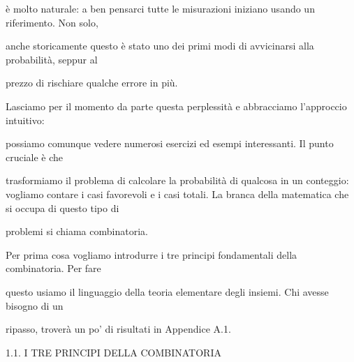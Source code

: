 \documentclass[a4paper,portrait,12pt]{article}
\begin{document}
\begin{flushleft}
\`{e} molto naturale: a ben pensarci tutte le misurazioni iniziano usando un riferimento. Non solo,
\end{flushleft}


\begin{flushleft}
anche storicamente questo \`{e} stato uno dei primi modi di avvicinarsi alla probabilit\`{a}, seppur al
\end{flushleft}


\begin{flushleft}
prezzo di rischiare qualche errore in più.
\end{flushleft}


\begin{flushleft}
Lasciamo per il momento da parte questa perplessit\`{a} e abbracciamo l'approccio intuitivo:
\end{flushleft}


\begin{flushleft}
possiamo comunque vedere numerosi esercizi ed esempi interessanti. Il punto cruciale \`{e} che
\end{flushleft}


\begin{flushleft}
trasformiamo il problema di calcolare la probabilit\`{a} di qualcosa in un conteggio: vogliamo contare i casi favorevoli e i casi totali. La branca della matematica che si occupa di questo tipo di
\end{flushleft}


\begin{flushleft}
problemi si chiama combinatoria.
\end{flushleft}


\begin{flushleft}
Per prima cosa vogliamo introdurre i tre principi fondamentali della combinatoria. Per fare
\end{flushleft}


\begin{flushleft}
questo usiamo il linguaggio della teoria elementare degli insiemi. Chi avesse bisogno di un
\end{flushleft}


\begin{flushleft}
ripasso, trover\`{a} un po' di risultati in Appendice A.1.
\end{flushleft}





\begin{flushleft}
1.1. I TRE PRINCIPI DELLA COMBINATORIA
\end{flushleft}
\end{document}
